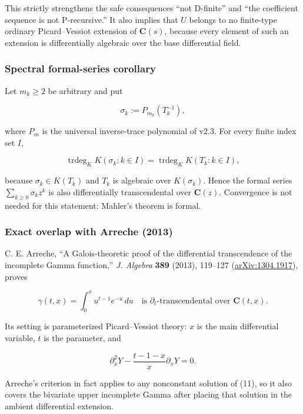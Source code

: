 \documentclass[11pt]{article}
\theoremstyle{keio}
\theoremstyle{definition}
\theoremstyle{remark}
\begin{document}
This strictly strengthens the safe consequences ``not D-finite'' and ``the
coefficient sequence is not P-recursive.'' It also implies that \(U\) belongs
to no finite-type ordinary Picard--Vessiot extension of \(\mathbf C(s)\),
because every element of such an extension is differentially algebraic over
the base differential field.

\subsubsection{Spectral formal-series corollary}

Let \(m_k\ge2\) be arbitrary and put

\[
 \sigma_k:=P_{m_k}(T_k^{-1}),
\]

where \(P_m\) is the universal inverse-trace polynomial of v2.3. For every
finite index set \(I\),

\[
 \operatorname{trdeg}_K K(\sigma_k:k\in I)
 =\operatorname{trdeg}_K K(T_k:k\in I),                                    \tag{GT-9}
\]

because \(\sigma_k\in K(T_k)\) and \(T_k\) is algebraic over
\(K(\sigma_k)\). Hence the formal series \(\sum_{k\ge0}\sigma_kz^k\) is
also differentially transcendental over \(\mathbf C(z)\). Convergence is
not needed for this statement: Mahler's theorem is formal.

\subsubsection{Exact overlap with Arreche (2013)}

C. E. Arreche, ``A Galois-theoretic proof of the differential transcendence
of the incomplete Gamma function,'' \emph{J. Algebra} \textbf{389} (2013), 119--127
(\href{https://arxiv.org/abs/1304.1917}{arXiv:1304.1917}), proves

\[
 \gamma(t,x)=\int_0^x u^{t-1}e^{-u}\,du
 \quad\text{is }\partial_t\text{-transcendental over }\mathbf C(t,x).       \tag{GT-10}
\]

Its setting is parameterized Picard--Vessiot theory: \(x\) is the main
differential variable, \(t\) is the parameter, and

\[
 \partial_x^2Y-\frac{t-1-x}{x}\partial_xY=0.                               \tag{GT-11}
\]

Arreche's criterion in fact applies to any nonconstant solution of (11), so
it also covers the bivariate upper incomplete Gamma after placing that
solution in the ambient differential extension.
\end{document}
